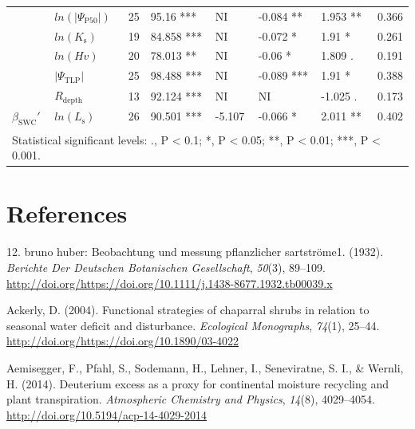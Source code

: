 \documentclass[11pt,twoside]{reedthesis}
\begin{document}
\begin{table}
{\begin{tabular}[t]{llrllllr}
\cmidrule{1-8}
 & $ln(\rvert\Psi_{\text{P50}}\rvert)$ & 25 & 95.16 *** & NI & -0.084 ** & 1.953 ** & 0.366\\
\cmidrule{2-8}
 & $ln(K_{\text{s}})$ & 19 & 84.858 *** & NI & -0.072 * & 1.91 * & 0.261\\
\cmidrule{2-8}
 & $ln(Hv)$ & 20 & 78.013 ** & NI & -0.06 * & 1.809 . & 0.191\\
\cmidrule{2-8}
 & $\rvert\Psi_{\text{TLP}}\rvert$ & 25 & 98.488 *** & NI & -0.089 *** & 1.91 * & 0.388\\
\cmidrule{2-8}
 & $R_{\text{depth}}$ & 13 & 92.124 *** & NI & NI & -1.025 . & 0.173\\
\cmidrule{2-8}
\multirow{-6}{*}{\raggedright\arraybackslash $\beta_{\text{SWC}}'$} & $ln(L_{\text{s}})$ & 26 & 90.501 *** & -5.107 & -0.066 * & 2.011 ** & 0.402\\
\bottomrule
\multicolumn{8}{l}{\textsuperscript{} Statistical significant levels: ., P < 0.1; *, P < 0.05; **, P < 0.01; ***, P < 0.001.}\\
\end{tabular}}
\end{table}
\chapter*{References}\label{references}


\noindent

\setlength{\parindent}{-0.20in} \setlength{\leftskip}{0.20in}
\setlength{\parskip}{8pt}

\hypertarget{refs}{}
\hypertarget{ref-Huber1932}{}
12. bruno huber: Beobachtung und messung pflanzlicher sartströme1.
(1932). \emph{Berichte Der Deutschen Botanischen Gesellschaft},
\emph{50}(3), 89--109.
\url{http://doi.org/https://doi.org/10.1111/j.1438-8677.1932.tb00039.x}

\hypertarget{ref-Ackerly2004}{}
Ackerly, D. (2004). Functional strategies of chaparral shrubs in
relation to seasonal water deficit and disturbance. \emph{Ecological
Monographs}, \emph{74}(1), 25--44.
\url{http://doi.org/https://doi.org/10.1890/03-4022}

\hypertarget{ref-Aemisegger2014}{}
Aemisegger, F., Pfahl, S., Sodemann, H., Lehner, I., Seneviratne, S. I.,
\& Wernli, H. (2014). Deuterium excess as a proxy for continental
moisture recycling and plant transpiration. \emph{Atmospheric Chemistry
and Physics}, \emph{14}(8), 4029--4054.
\url{http://doi.org/10.5194/acp-14-4029-2014}
\end{document}
